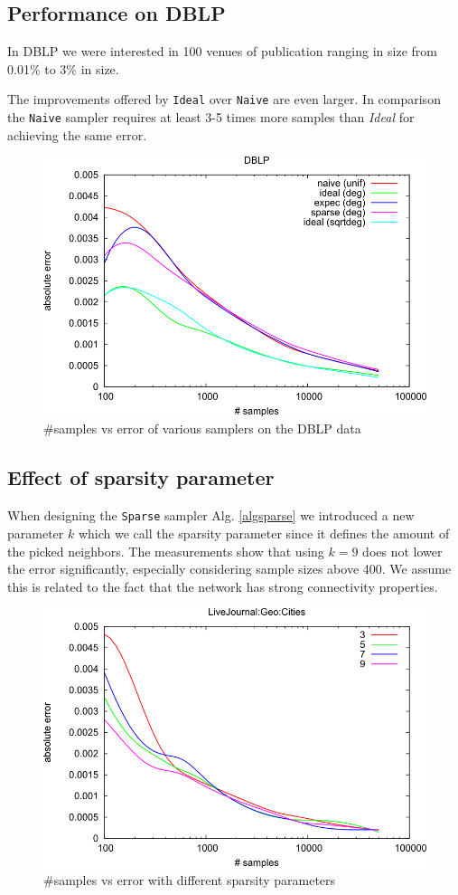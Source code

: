 \subsection{Performance on DBLP}
In DBLP we were interested in 100 venues of publication ranging in size from 0.01\% to 3\% in size.

The improvements offered by \texttt{Ideal} over \texttt{Naive} are even larger. In comparison the \texttt{Naive} sampler requires at least 3-5 times more samples than \textit{Ideal} for achieving the same error.
\begin{figure}[!ht]
  \begin{center}
    \includegraphics[width=0.5\linewidth]{fig4}
    \caption{\#samples vs error of various samplers on the DBLP data}
  \end{center}
\end{figure}
\subsection{Effect of sparsity parameter}
When designing the \texttt{Sparse} sampler Alg. \ref{algsparse} we introduced a new parameter $k$ which we call the sparsity parameter since it defines the amount of the picked neighbors.
The measurements show that using $k=9$ does not lower the error significantly, especially considering sample sizes above 400.
We assume this is related to the fact that the network has strong connectivity properties.
\begin{figure}[!ht]
  \begin{center}
    \includegraphics[width=0.5\linewidth]{fig7b}
    \caption{\#samples vs error with different sparsity parameters}
  \end{center}
\end{figure}

